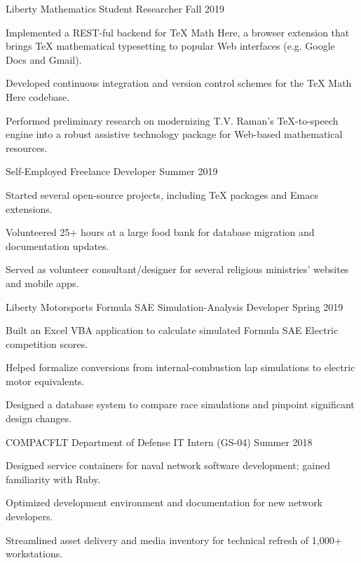 \documentclass{awesome-cv}
\begin{document}
\begin{cventries}
  \cventry
  {Liberty Mathematics}
  {Student Researcher}
  {}
  {Fall 2019}
  {
    \begin{cvitems}
    \item Implemented a REST-ful backend for \TeX{} Math Here, a browser extension
      that brings \TeX{} mathematical typesetting to popular Web interfaces (e.g.
      Google Docs and Gmail).
    \item Developed continuous integration and version control schemes
      for the \TeX{} Math Here codebase.
    \item Performed preliminary research on modernizing T.V. Raman's \TeX{}-to-speech engine
      into a robust assistive technology package for Web-based mathematical resources.
    \end{cvitems}
  }

  \cventry
  {Self-Employed}
  {Freelance Developer}
  {}
  {Summer 2019}
  {
    \begin{cvitems}
    \item Started several open-source projects, including \TeX{} packages and
      Emacs extensions.
    \item Volunteered 25+ hours at a large food bank for database migration and
     documentation updates.
    \item Served as volunteer consultant/designer for several religious ministries'
      websites and mobile apps.
    \end{cvitems}
  }


  \cventry
  {Liberty Motorsports}
  {Formula SAE Simulation-Analysis Developer}
  {}
  {Spring 2019}
  {
    \begin{cvitems}
    \item Built an Excel VBA application to calculate simulated Formula SAE Electric
      competition scores.
    \item Helped formalize conversions from internal-combustion lap simulations
      to electric motor equivalents.
    \item Designed a database system to compare race simulations and
      pinpoint significant design changes.
    \end{cvitems}
  }

  \cventry
  {COMPACFLT}
  {Department of Defense IT Intern (GS-04)}
  {}
  {Summer 2018}
  {
    \begin{cvitems}
    \item Designed service containers for naval network software
      development; gained familiarity with Ruby.
    \item Optimized development environment and documentation for new network
      developers.
    \item Streamlined asset delivery and media inventory for technical refresh of
      1,000+ workstations.
    \end{cvitems}
  }
\end{cventries}
\end{document}
